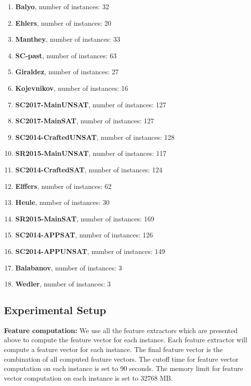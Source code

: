 \documentclass[british]{article}
\begin{document}
\begin{enumerate}
\item \textbf{Balyo}, number of instances: 32
\item \textbf{Ehlers}, number of instances: 20
\item \textbf{Manthey}, number of instances: 33
\item \textbf{SC-past}, number of instances: 63
\item \textbf{Giraldez}, number of instances: 27
\item \textbf{Kojevnikov}, number of instances: 16
\item \textbf{SC2017-Main\textunderscore UNSAT}, number of instances: 127
\item \textbf{SC2017-Main\textunderscore SAT}, number of instances: 127
\item \textbf{SC2014-Crafted\textunderscore UNSAT}, number of instances: 128
\item \textbf{SR2015-Main\textunderscore UNSAT}, number of instances: 117
\item \textbf{SC2014-Crafted\textunderscore SAT}, number of instances: 124
\item \textbf{Elffers}, number of instances: 62
\item \textbf{Heule}, number of instances: 30
\item \textbf{SR2015-Main\textunderscore SAT}, number of instances: 169
\item \textbf{SC2014-APP\textunderscore SAT}, number of instances: 126
\item \textbf{SC2014-APP\textunderscore UNSAT}, number of instances: 149
\item \textbf{Balabanov}, number of instances: 3
\item \textbf{Wedler}, number of instances: 3

\end{enumerate}

\subsection{Experimental Setup}
\label{sec:Experimental_Setup}

\textbf{Feature computation:} We use all the feature extractors which are presented above to compute the feature vector for each instance. Each feature extractor will compute a feature vector for each instance. The final feature vector is the combination of all computed feature vectors. The cutoff time for feature vector computation on each instance is set to 90 seconds. The memory limit for feature vector computation on each instance is set to 32768 MB.
\end{document}

